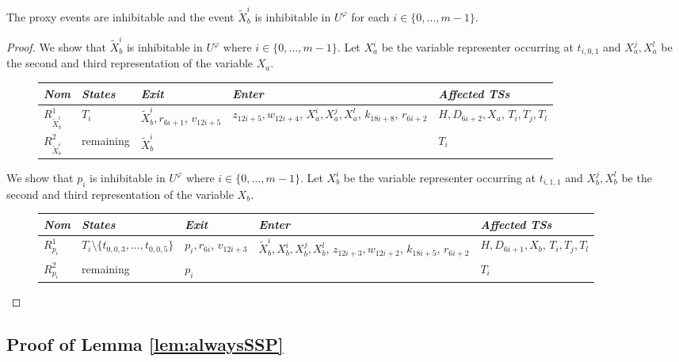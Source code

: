 \documentclass[english]{lipics_hacked}
\begin{document}
\begin{lemma}
\label{lemma:proxylocum}
The proxy events are inhibitable and the event $\tilde{X}^i_b$ is inhibitable in $U^\varphi$ for each $i \in \{0,\dots,m-1\}$.
\end{lemma}
%
\begin{proof}
We show that $\tilde{X}^i_b$ is inhibitable in $U^\varphi$ where $i \in \{0,\dots,m-1\}$.
Let $X_a^i$ be the variable representer occurring at $t_{i,0,1}$ and $X_a^j,X_a^l$ be the second and third representation of the variable $X_a$.
\begin{figure}[H]
\centering
\begin{longtable}{p{0.7cm} p{3cm}   p{2.5cm}    p{2.5cm}      p{2.7cm}  }
\textit{Nom} &\textit{States} & \textit{Exit} & \textit{Enter} & \textit{Affected TSs}  \\ \hline
$R_{\tilde{X}^i_b}^1$ & $T_i$ & $\tilde{X}^i_b,r_{6i+1}$, $v_{12i+5}$ & $z_{12i+5},w_{12i+4}$, $X_a^i,X_a^j,X_a^l$, $k_{18i+8}$, $r_{6i+2}$ & $H,D_{6i+2},X_a$, $T_i,T_j,T_l$ \\
 $R_{\tilde{X}^i_b}^2$ & remaining & $\tilde{X}^i_b$ & & $T_i$ \\						
\end{longtable}
\end{figure}
%
We show that $p_i$ is inhibitable in $U^\varphi$ where $i\in \{0,\dots,m-1\}$.
Let $X_b^{i}$ be the variable representer occurring at $t_{i,1,1}$  and $X_b^j,X_b^l$ be the second and third representation of the variable $X_b$.
%
\begin{figure}[H]
\centering
\begin{tabular}{p{0.7cm} p{3cm}   p{2.5cm}    p{2.5cm}      p{2.7cm}  }
\textit{Nom} &\textit{States} & \textit{Exit} & \textit{Enter} & \textit{Affected TSs} \\ \hline
$R_{p_i}^1$ & $T_i\setminus \{t_{0,0,3},\dots,t_{0,0,5}\}$ & $p_i,r_{6i}$, $v_{12i+3}$ & $\tilde{X}^i_b, X^i_b, X^j_b, X^l_b$, $z_{12i+3},w_{12i+2}$, $k_{18i+5}$, $r_{6i+2}$ & $H,D_{6i+1}, X_b$, $T_i, T_j,T_l$ \\
 $R_{p_i}^2$ & remaining & $p_i$ & & $T_i$ \\						
\end{tabular}
\end{figure}
\end{proof}
%


\subsection{Proof of Lemma \ref{lem:alwaysSSP}}
\end{document}
